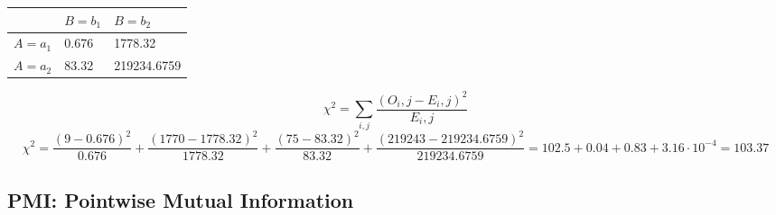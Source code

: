 \documentclass{article}
\begin{document}
\renewcommand{\arraystretch}{1}
	\begin{center}
	\begin{tabular} { | m{2cm} | m{2cm} | m{2cm} |  }
		\hline
		 & $B = b_1$ & $B = b_2$ \\
		\hline
		$A = a_1$ & 0.676 & 1778.32 \\
		\hline
		$A = a_2$ & 83.32 & 219234.6759 \\
		\hline
	\end{tabular}
	\end{center}
	\begin{equation*}
		\chi^2 = \sum_{i,j} \frac{(O_i,j - E_i,j)^2}{E_i,j}
	\end{equation*}
	\begin{equation*}
	\chi^2 = \frac{(9-0.676)^2}{0.676} + \frac{(1770-1778.32)^2}{1778.32} + \frac{(75-83.32)^2}{83.32} + \frac{(219243-219234.6759)^2}{219234.6759} = 102.5 + 0.04 + 0.83 + 3.16 \cdot 10^{-4} = 103.37
	\end{equation*}
	\subsection { PMI: Pointwise Mutual Information }
\end{document}
